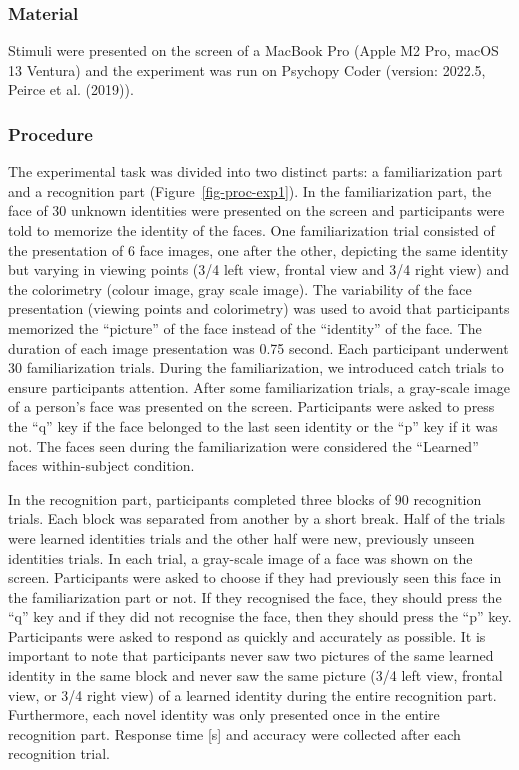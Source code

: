 \documentclass[
  letterpaper,
  DIV=11,
  numbers=noendperiod]{scrartcl}
\begin{document}
\subsubsection{Material}\label{material}

Stimuli were presented on the screen of a MacBook Pro (Apple M2 Pro,
macOS 13 Ventura) and the experiment was run on Psychopy Coder (version:
2022.5, Peirce et al. (2019)).

\subsubsection{Procedure}\label{procedure}

The experimental task was divided into two distinct parts: a
familiarization part and a recognition part
(Figure~\ref{fig-proc-exp1}). In the familiarization part, the face of
30 unknown identities were presented on the screen and participants were
told to memorize the identity of the faces. One familiarization trial
consisted of the presentation of 6 face images, one after the other,
depicting the same identity but varying in viewing points (3/4 left
view, frontal view and 3/4 right view) and the colorimetry (colour
image, gray scale image). The variability of the face presentation
(viewing points and colorimetry) was used to avoid that participants
memorized the ``picture'' of the face instead of the ``identity'' of the
face. The duration of each image presentation was 0.75 second. Each
participant underwent 30 familiarization trials. During the
familiarization, we introduced catch trials to ensure participants
attention. After some familiarization trials, a gray-scale image of a
person's face was presented on the screen. Participants were asked to
press the ``q'' key if the face belonged to the last seen identity or
the ``p'' key if it was not. The faces seen during the familiarization
were considered the ``Learned'' faces within-subject condition.

In the recognition part, participants completed three blocks of 90
recognition trials. Each block was separated from another by a short
break. Half of the trials were learned identities trials and the other
half were new, previously unseen identities trials. In each trial, a
gray-scale image of a face was shown on the screen. Participants were
asked to choose if they had previously seen this face in the
familiarization part or not. If they recognised the face, they should
press the ``q'' key and if they did not recognise the face, then they
should press the ``p'' key. Participants were asked to respond as
quickly and accurately as possible. It is important to note that
participants never saw two pictures of the same learned identity in the
same block and never saw the same picture (3/4 left view, frontal view,
or 3/4 right view) of a learned identity during the entire recognition
part. Furthermore, each novel identity was only presented once in the
entire recognition part. Response time {[}s{]} and accuracy were
collected after each recognition trial.
\end{document}

